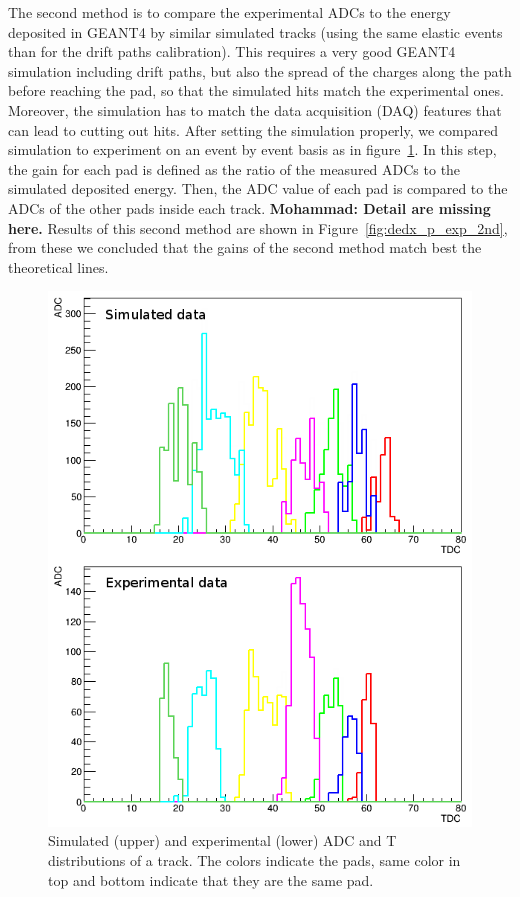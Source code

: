 \documentclass[twocolumn,showpacs,superscriptaddress,groupedaddress]{revtex4}
\begin{document}
The second method is to compare the experimental ADCs to the energy deposited in 
GEANT4 by similar simulated tracks (using the same elastic events than for the drift 
paths calibration). This requires a very good GEANT4 simulation 
including drift paths, but also the spread of the charges along the path
before reaching the pad, so that the simulated hits match the experimental 
ones. Moreover, the simulation has to match the data acquisition (DAQ) features 
that can lead to cutting out hits. After setting the simulation properly, we 
compared simulation to experiment on an event by event basis as in 
figure~\ref{fig:EVENT_adc_tdc}. In this step, the gain for each pad is defined 
as the ratio of the measured ADCs to the simulated deposited energy.
Then, the ADC value of each pad is compared to 
the ADCs of the other pads inside each track.
{\bf \color{red} Mohammad: Detail are missing here.}
Results of this second method are shown in Figure~\ref{fig:dedx_p_exp_2nd},
from these we concluded that the gains of the 
second method match best the theoretical lines.

\begin{figure}[tb]
   \centering
\includegraphics[scale=0.350]{fig/EVENT_adc_tdc.png}
\caption{Simulated (upper) and experimental (lower) ADC and T distributions 
of a track. The colors indicate the pads, same color in top and bottom indicate 
that they are the same pad.}
\label{fig:EVENT_adc_tdc}
\end{figure}
\end{document}
